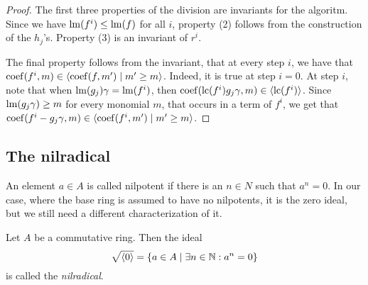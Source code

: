 \begin{proof}
  The first three properties of the division are invariants for the algoritm. Since we have $\operatorname{lm}(f^{i}) \leq \operatorname{lm}(f)$ for all $i$, property (2) follows from the construction of the $h_{j}$'s. Property (3) is an invariant of $r^{i}$.

  The final property follows from the invariant, that at every step $i$, we have that $\operatorname{coef}(f^{i}, m) \in \langle \operatorname{coef}(f, m') \mid m' \geq m \rangle$. Indeed, it is true at step $i=0$. At step $i$, note that when $\operatorname{lm}(g_{j}) \gamma = \operatorname{lm}(f^{i})$, then $\operatorname{coef}(\operatorname{lc}(f^{i})g_{j} \gamma, m) \in \langle \operatorname{lc}(f^{i}) \rangle$. Since $\operatorname{lm}(g_{j} \gamma) \geq m$ for every monomial $m$, that occurs in a term of $f^{i}$, we get that $\operatorname{coef}(f^{i} - g_{j} \gamma, m) \in \langle \operatorname{coef}(f^{i}, m') \mid m' \geq m \rangle$.
\end{proof}




\subsection{The nilradical}
An element $a \in A$ is called nilpotent if there is an $n \in N$ such that $a^{n} = 0$. In our case, where the base ring is assumed to have no nilpotents, it is the zero ideal, but we still need a different characterization of it.

\begin{definition}[Nilradical]
  Let $A$ be a commutative ring. Then the ideal \[\sqrt{\langle 0 \rangle} = \{a \in A \mid \exists n \in \mathbb{N} : a^{n} = 0\}\] is called the \textit{nilradical}.
\end{definition}

